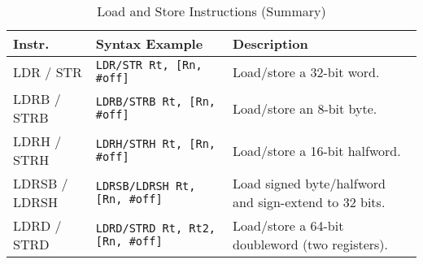 \begin{table}[H]
\centering
\caption{Load and Store Instructions (Summary)}
\small
\begin{tabularx}{\linewidth}{@{}l l X@{}}
\toprule
\textbf{Instr.} & \textbf{Syntax Example} & \textbf{Description} \\
\midrule
LDR / STR       & \texttt{LDR/STR Rt, [Rn, \#off]} & Load/store a 32-bit word. \\
LDRB / STRB     & \texttt{LDRB/STRB Rt, [Rn, \#off]} & Load/store an 8-bit byte. \\
LDRH / STRH     & \texttt{LDRH/STRH Rt, [Rn, \#off]} & Load/store a 16-bit halfword. \\
LDRSB / LDRSH   & \texttt{LDRSB/LDRSH Rt, [Rn, \#off]} & Load signed byte/halfword and sign-extend to 32 bits. \\
LDRD / STRD     & \texttt{LDRD/STRD Rt, Rt2, [Rn, \#off]} & Load/store a 64-bit doubleword (two registers). \\
\bottomrule
\end{tabularx}
\vspace{2pt}
\end{table}

